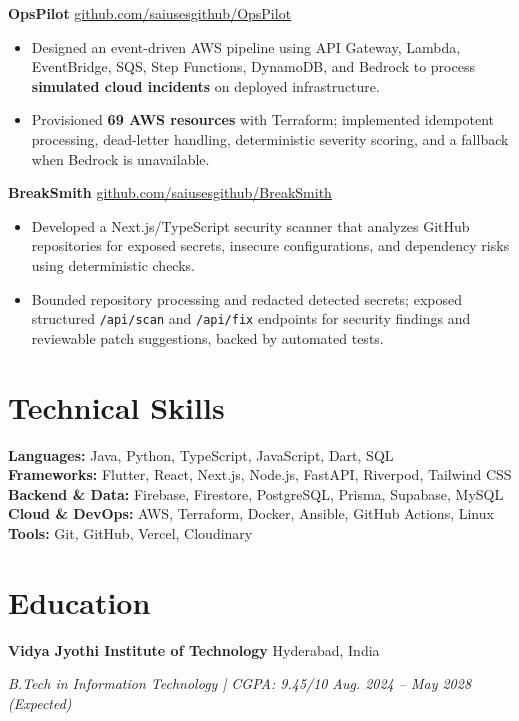 \documentclass[letterpaper,11pt]{article}
\newcommand{\resumeBulletsStart}{
  \begin{itemize}[
    leftmargin=0.18in,
    label=\textbullet,
    topsep=1pt,
    partopsep=0pt,
    itemsep=1pt,
    parsep=0pt
  ]
}
\newcommand{\resumeBulletsEnd}{\end{itemize}}
\newcommand{\resBullet}[1]{\item\small #1}
\newcommand{\project}[3]{%
  \par\vspace{2pt}
  \noindent
  \textbf{#1}\hfill
  \href{#2}{\underline{\footnotesize #3}}
  \par\vspace{-1pt}
}
\begin{document}
\project{OpsPilot}
  {https://github.com/saiusesgithub/OpsPilot}
  {github.com/saiusesgithub/OpsPilot}
\resumeBulletsStart
  \resBullet{Designed an event-driven AWS pipeline using API Gateway, Lambda, EventBridge, SQS, Step Functions, DynamoDB, and Bedrock to process \textbf{simulated cloud incidents} on deployed infrastructure.}
  \resBullet{Provisioned \textbf{69 AWS resources} with Terraform; implemented idempotent processing, dead-letter handling, deterministic severity scoring, and a fallback when Bedrock is unavailable.}
\resumeBulletsEnd

\project{BreakSmith}
  {https://github.com/saiusesgithub/BreakSmith}
  {github.com/saiusesgithub/BreakSmith}
\resumeBulletsStart
  \resBullet{Developed a Next.js/TypeScript security scanner that analyzes GitHub repositories for exposed secrets, insecure configurations, and dependency risks using deterministic checks.}
  \resBullet{Bounded repository processing and redacted detected secrets; exposed structured \texttt{/api/scan} and \texttt{/api/fix} endpoints for security findings and reviewable patch suggestions, backed by automated tests.}
\resumeBulletsEnd

\section{Technical Skills}
{\small
\textbf{Languages:}
Java, Python, TypeScript, JavaScript, Dart, SQL\\[1pt]
\textbf{Frameworks:}
Flutter, React, Next.js, Node.js, FastAPI, Riverpod, Tailwind CSS\\[1pt]
\textbf{Backend \& Data:}
Firebase, Firestore, PostgreSQL, Prisma, Supabase, MySQL\\[1pt]
\textbf{Cloud \& DevOps:}
AWS, Terraform, Docker, Ansible, GitHub Actions, Linux\\[1pt]
\textbf{Tools:}
Git, GitHub, Vercel, Cloudinary
}

\section{Education}
\noindent
\textbf{Vidya Jyothi Institute of Technology}
\hfill\small Hyderabad, India\par

\noindent
\textit{\small B.Tech in Information Technology | CGPA: 9.45/10}
\hfill
\textit{\small Aug. 2024 -- May 2028 (Expected)}

\end{document}

